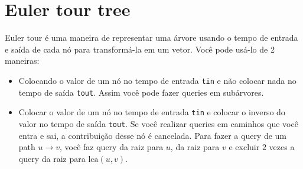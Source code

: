 
    
    \section{Euler tour tree}
    Euler tour é uma maneira de representar uma árvore usando o tempo de entrada e saída de cada nó para transformá-la em um vetor. Você pode usá-lo de 2 maneiras:
    \begin{itemize}
        \item Colocando o valor de um nó no tempo de entrada \texttt{tin} e não colocar nada no tempo de saída \texttt{tout}. Assim você pode fazer queries em subárvores.
        \item Colocar o valor de um nó no tempo de entrada \texttt{tin} e colocar o inverso do valor no tempo de saída \texttt{tout}. Se você realizar queries em caminhos que você entra e sai, a contribuição desse nó é cancelada. Para fazer a query de um path $u\rightarrow v$, você faz query da raiz para $u$, da raiz para $v$ e excluir $2$ vezes a query da raiz para $\text{lca}(u,v)$.
    \end{itemize}
